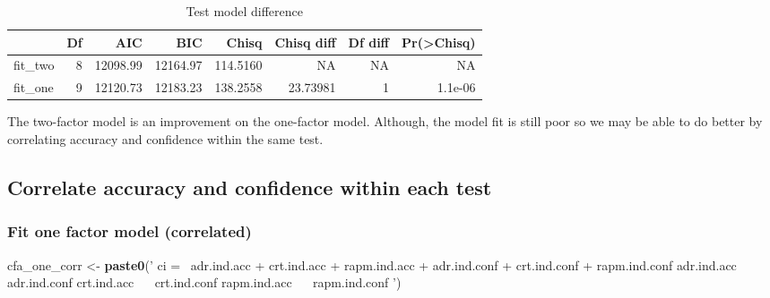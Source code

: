 \documentclass[
]{article}
\newenvironment{Shaded}{\begin{snugshade}}{\end{snugshade}}
\newcommand{\KeywordTok}[1]{\textcolor[rgb]{0.13,0.29,0.53}{\textbf{#1}}}
\newcommand{\NormalTok}[1]{#1}
\newcommand{\StringTok}[1]{\textcolor[rgb]{0.31,0.60,0.02}{#1}}
\begin{document}
\begin{table}[H]

\caption{\label{tab:unnamed-chunk-5}Test model difference}
\centering
\fontsize{12}{14}\selectfont
\begin{tabular}[t]{lrrrrrrr}
\toprule
  & Df & AIC & BIC & Chisq & Chisq diff & Df diff & Pr(>Chisq)\\
\midrule
fit\_two & 8 & 12098.99 & 12164.97 & 114.5160 & NA & NA & NA\\
fit\_one & 9 & 12120.73 & 12183.23 & 138.2558 & 23.73981 & 1 & 1.1e-06\\
\bottomrule
\end{tabular}
\end{table}

The two-factor model is an improvement on the one-factor model.
Although, the model fit is still poor so we may be able to do better by
correlating accuracy and confidence within the same test.

\hypertarget{correlate-accuracy-and-confidence-within-each-test}{%
\subsection{Correlate accuracy and confidence within each
test}\label{correlate-accuracy-and-confidence-within-each-test}}

\hypertarget{fit-one-factor-model-correlated}{%
\subsubsection{Fit one factor model
(correlated)}\label{fit-one-factor-model-correlated}}

\begin{Shaded}
\begin{Highlighting}[]
\NormalTok{cfa_one_corr <-}\StringTok{ }\KeywordTok{paste0}\NormalTok{(}\StringTok{'}
\StringTok{                ci  =~ adr.ind.acc + crt.ind.acc + rapm.ind.acc +}
\StringTok{                        adr.ind.conf + crt.ind.conf + rapm.ind.conf}
\StringTok{                        }
\StringTok{                adr.ind.acc ~~ adr.ind.conf}
\StringTok{                crt.ind.acc ~~ crt.ind.conf}
\StringTok{                rapm.ind.acc ~~ rapm.ind.conf}
\StringTok{                '}\NormalTok{)}
\end{Highlighting}
\end{Shaded}
\end{document}
